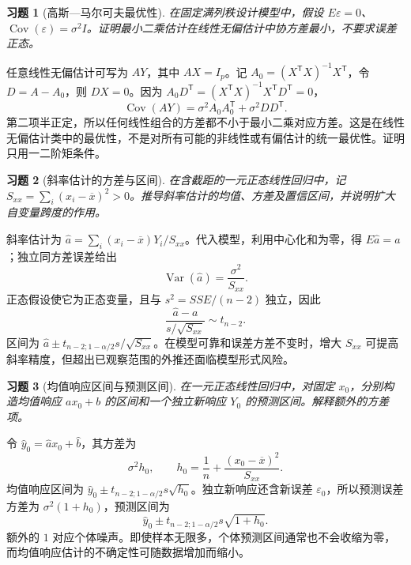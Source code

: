 \documentclass[12pt,fontset=fandol]{ctexart}
\newtheorem{exercise}{习题}[section]
\begin{document}
\begin{exercise}[高斯—马尔可夫最优性]\label{q:B16.2}
在固定满列秩设计模型中，假设 $E\varepsilon=0$、$\operatorname{Cov}(\varepsilon)=\sigma^2I$。证明最小二乘估计在线性无偏估计中协方差最小，不要求误差正态。\par{}
\end{exercise}

\begin{solve}\label{a:B16.2}任意线性无偏估计可写为 $AY$，其中 $AX=I_p$。记 $A_0=(X^\mathsf TX)^{-1}X^\mathsf T$，令 $D=A-A_0$，则 $DX=0$。因为 $A_0D^\mathsf T=(X^\mathsf TX)^{-1}X^\mathsf TD^\mathsf T=0$，\[\operatorname{Cov}(AY)=\sigma^2A_0A_0^\mathsf T+\sigma^2DD^\mathsf T.\]第二项半正定，所以任何线性组合的方差都不小于最小二乘对应方差。这是在线性无偏估计类中的最优性，不是对所有可能的非线性或有偏估计的统一最优性。证明只用一二阶矩条件。\end{solve}

\begin{exercise}[斜率估计的方差与区间]\label{q:B16.3}
在含截距的一元正态线性回归中，记 $S_{xx}=\sum_i(x_i-\overline x)^2>0$。推导斜率估计的均值、方差及置信区间，并说明扩大自变量跨度的作用。\par{}
\end{exercise}

\begin{solve}\label{a:B16.3}斜率估计为 $\widehat a=\sum_i(x_i-\overline x)Y_i/S_{xx}$。代入模型，利用中心化和为零，得 $E\widehat a=a$；独立同方差误差给出\[\operatorname{Var}(\widehat a)=\frac{\sigma^2}{S_{xx}}.\]正态假设使它为正态变量，且与 $s^2=SSE/(n-2)$ 独立，因此\[\frac{\widehat a-a}{s/\sqrt{S_{xx}}}\sim t_{n-2}.\]区间为 $\widehat a\pm t_{n-2;1-\alpha/2}s/\sqrt{S_{xx}}$。在模型可靠和误差方差不变时，增大 $S_{xx}$ 可提高斜率精度，但超出已观察范围的外推还面临模型形式风险。\end{solve}

\begin{exercise}[均值响应区间与预测区间]\label{q:B16.4}
在一元正态线性回归中，对固定 $x_0$，分别构造均值响应 $a x_0+b$ 的区间和一个独立新响应 $Y_0$ 的预测区间。解释额外的方差项。\par{}
\end{exercise}

\begin{solve}\label{a:B16.4}令 $\widehat y_0=\widehat a x_0+\widehat b$，其方差为\[\sigma^2h_0,\qquad h_0=\frac1n+\frac{(x_0-\overline x)^2}{S_{xx}}.\]均值响应区间为 $\widehat y_0\pm t_{n-2;1-\alpha/2}s\sqrt{h_0}$。独立新响应还含新误差 $\varepsilon_0$，所以预测误差方差为 $\sigma^2(1+h_0)$，预测区间为\[\widehat y_0\pm t_{n-2;1-\alpha/2}s\sqrt{1+h_0}.\]额外的 $1$ 对应个体噪声。即使样本无限多，个体预测区间通常也不会收缩为零，而均值响应估计的不确定性可随数据增加而缩小。\end{solve}
\end{document}

